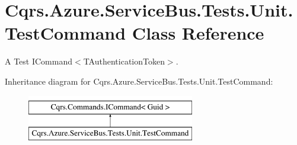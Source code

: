 \hypertarget{classCqrs_1_1Azure_1_1ServiceBus_1_1Tests_1_1Unit_1_1TestCommand}{}\section{Cqrs.\+Azure.\+Service\+Bus.\+Tests.\+Unit.\+Test\+Command Class Reference}
\label{classCqrs_1_1Azure_1_1ServiceBus_1_1Tests_1_1Unit_1_1TestCommand}


A Test I\+Command$<$\+T\+Authentication\+Token$>$.  


Inheritance diagram for Cqrs.\+Azure.\+Service\+Bus.\+Tests.\+Unit.\+Test\+Command\+:\begin{figure}[H]
\begin{center}
\leavevmode
\includegraphics[height=2.000000cm]{classCqrs_1_1Azure_1_1ServiceBus_1_1Tests_1_1Unit_1_1TestCommand}
\end{center}
\end{figure}
